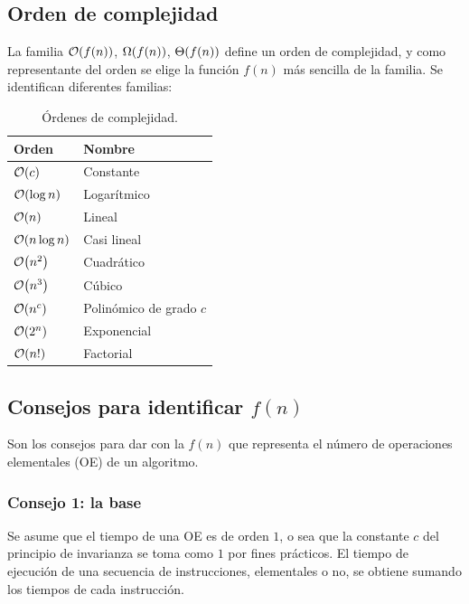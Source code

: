 \documentclass[11pt,letterpaper]{article}
\begin{document}
\subsection*{Orden de complejidad}

La familia $\mathcal{O}\!\left(f(n)\right)$, $\Omega\!\left(f(n)\right)$, $\Theta\!\left(f(n)\right)$ define un orden de
complejidad, y como representante del orden se elige la función $f(n)$
más sencilla de la familia. Se identifican diferentes familias:

\begin{table}[htbp]
  \centering
  \begin{tabular}{ll}
    \toprule
    \textbf{Orden} & \textbf{Nombre} \\
    \midrule
    $\mathcal{O}\!\left(c\right)$          & Constante \\
    $\mathcal{O}\!\left(\log n\right)$     & Logarítmico \\
    $\mathcal{O}\!\left(n\right)$          & Lineal \\
    $\mathcal{O}\!\left(n \log n\right)$   & Casi lineal \\
    $\mathcal{O}\!\left(n^2\right)$        & Cuadrático \\
    $\mathcal{O}\!\left(n^3\right)$        & Cúbico \\
    $\mathcal{O}\!\left(n^c\right)$        & Polinómico de grado $c$ \\
    $\mathcal{O}\!\left(2^n\right)$        & Exponencial \\
    $\mathcal{O}\!\left(n!\right)$         & Factorial \\
    \bottomrule
  \end{tabular}
  \caption{Órdenes de complejidad.}
  \label{tab:ordenes}
\end{table}


\subsection*{Consejos para identificar $f(n)$}

Son los consejos para dar con la $f(n)$ que representa el número de
operaciones elementales (OE) de un algoritmo.

\subsubsection*{Consejo 1: la base}

Se asume que el tiempo de una OE es de orden $1$, o sea que la
constante $c$ del principio de invarianza se toma como $1$ por fines
prácticos. El tiempo de ejecución de una secuencia de instrucciones,
elementales o no, se obtiene sumando los tiempos de cada instrucción.
\end{document}
